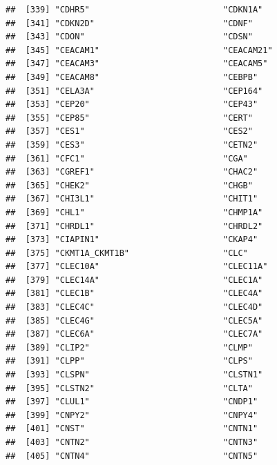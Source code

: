 \documentclass[
]{article}
\begin{document}
\begin{verbatim}
##  [339] "CDHR5"                           "CDKN1A"                         
##  [341] "CDKN2D"                          "CDNF"                           
##  [343] "CDON"                            "CDSN"                           
##  [345] "CEACAM1"                         "CEACAM21"                       
##  [347] "CEACAM3"                         "CEACAM5"                        
##  [349] "CEACAM8"                         "CEBPB"                          
##  [351] "CELA3A"                          "CEP164"                         
##  [353] "CEP20"                           "CEP43"                          
##  [355] "CEP85"                           "CERT"                           
##  [357] "CES1"                            "CES2"                           
##  [359] "CES3"                            "CETN2"                          
##  [361] "CFC1"                            "CGA"                            
##  [363] "CGREF1"                          "CHAC2"                          
##  [365] "CHEK2"                           "CHGB"                           
##  [367] "CHI3L1"                          "CHIT1"                          
##  [369] "CHL1"                            "CHMP1A"                         
##  [371] "CHRDL1"                          "CHRDL2"                         
##  [373] "CIAPIN1"                         "CKAP4"                          
##  [375] "CKMT1A_CKMT1B"                   "CLC"                            
##  [377] "CLEC10A"                         "CLEC11A"                        
##  [379] "CLEC14A"                         "CLEC1A"                         
##  [381] "CLEC1B"                          "CLEC4A"                         
##  [383] "CLEC4C"                          "CLEC4D"                         
##  [385] "CLEC4G"                          "CLEC5A"                         
##  [387] "CLEC6A"                          "CLEC7A"                         
##  [389] "CLIP2"                           "CLMP"                           
##  [391] "CLPP"                            "CLPS"                           
##  [393] "CLSPN"                           "CLSTN1"                         
##  [395] "CLSTN2"                          "CLTA"                           
##  [397] "CLUL1"                           "CNDP1"                          
##  [399] "CNPY2"                           "CNPY4"                          
##  [401] "CNST"                            "CNTN1"                          
##  [403] "CNTN2"                           "CNTN3"                          
##  [405] "CNTN4"                           "CNTN5"                          

\end{verbatim}
\end{document}
